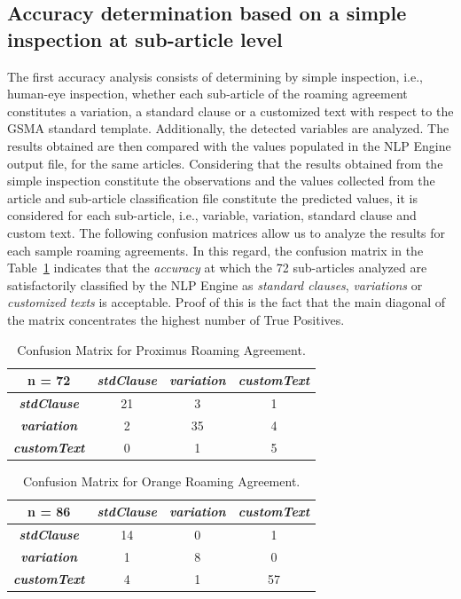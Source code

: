 \documentclass[conference]{style/IEEEtran}
\begin{document}
\subsection{Accuracy determination based on a simple inspection at sub-article level}
The first accuracy analysis consists of determining by simple inspection, i.e., human-eye inspection, whether each sub-article of the roaming agreement constitutes a variation, a standard clause or a customized text with respect to the GSMA standard template. Additionally, the detected variables are analyzed. The results obtained are then compared with the values populated in the NLP Engine output file, for the same articles. Considering that the results obtained from the simple inspection constitute the observations and the values collected from the article and sub-article classification file constitute the predicted values, it is considered for each sub-article, i.e., variable, variation, standard clause and custom text. The following confusion matrices allow us to analyze the results for each sample roaming agreements. In this regard, the confusion matrix in the Table~\ref{table1} indicates that the \textit{accuracy} at which the 72 sub-articles analyzed are satisfactorily classified by the NLP Engine as \textit{standard clauses}, \textit{variations} or \textit{customized texts} is acceptable. Proof of this is the fact that the main diagonal of the matrix concentrates the highest number of True Positives. 

\begin{table}[htbp]
\caption{Confusion Matrix for Proximus Roaming Agreement.}
\begin{center}
\begin{tabular}{|c|c|c|c|}
\hline
\textbf{n = 72} & \textbf{\textit{stdClause}}& \textbf{\textit{variation}}& \textbf{\textit{customText}} \\
\hline
\textbf{\textit{stdClause}}& 21 & 3 & 1 \\
\hline
\textbf{\textit{variation}}& 2 & 35 & 4 \\
\hline
\textbf{\textit{customText}}& 0 & 1 & 5 \\
\hline
\end{tabular}
\label{table1}
\end{center}
\end{table}

\begin{table}[htbp]
\caption{Confusion Matrix for Orange Roaming Agreement.}
\begin{center}
\begin{tabular}{|c|c|c|c|}
\hline
\textbf{n = 86} & \textbf{\textit{stdClause}}& \textbf{\textit{variation}}& \textbf{\textit{customText}} \\
\hline
\textbf{\textit{stdClause}}& 14 & 0 & 1 \\
\hline
\textbf{\textit{variation}}& 1 & 8 & 0 \\
\hline
\textbf{\textit{customText}}& 4 & 1 & 57 \\
\hline
\end{tabular}
\label{table2}
\end{center}
\end{table}
\end{document}
